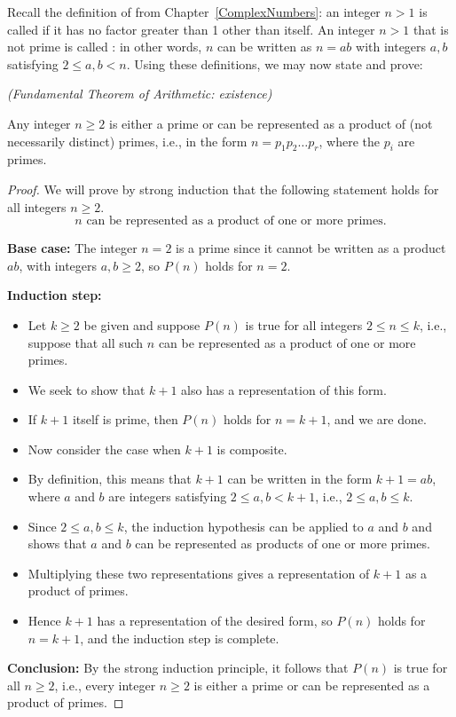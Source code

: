 Recall the definition of  from Chapter~\ref{ComplexNumbers}: an integer $n>1$ is called 
 if it has no factor greater than 1 other than itself. An integer $n>1$ that is not prime is called
: in other words, $n$ can be written as $n=ab$
with integers $a,b$ satisfying $2\le a,b<n$. Using these definitions, we may now state and prove:

\begin{prop}{}\emph{(Fundamental Theorem of Arithmetic: existence)}

Any integer $n\ge 2$
is either a prime or can be represented as a product of (not
necessarily distinct) primes, i.e., in the form $n=p_1p_2\dots p_r$,
where the $p_i$ are primes.
\end{prop}

\begin{proof}
We will prove by strong induction that the following statement  
holds for all integers $n\ge2$.
\[
\text{$n$ can be represented as a product of one or more primes.}
\tag{$P(n)$}
\]

\noindent
\textbf{Base case:} The integer $n=2$ is a prime since it cannot be
written as a product $ab$, with integers $a,b\ge 2$,  so $P(n)$ holds
for $n=2$.

\noindent
\textbf{Induction step:} 
\begin{itemize}

\item Let $k\ge2$ be given and suppose $P(n)$ is true for all 
integers $2\le n\le k$, i.e., suppose that all such $n$ can be represented 
as a product of one or more primes.
\item We seek to show that $k+1$ also has a
representation of this form.
\item
If $k+1$ itself is prime, then $P(n)$ holds for $n=k+1$, and we are done.
\item
Now consider the case when $k+1$ is composite.
\item 
By definition, this means that $k+1$
can be written in the form $k+1=ab$, where $a$ and $b$ are integers satisfying
$2\le a,b< k+1$, i.e., $2\le a,b\le k$. 
\item
Since $2\le a,b\le k$, the induction hypothesis can be applied to $a$ and $b$
and shows that $a$ and $b$ can be represented as products
of one or more primes.
\item
Multiplying these two representations gives a representation of $k+1$ as
a product of primes. 
\item
Hence $k+1$ has a representation of the desired form, so $P(n)$ holds
for $n=k+1$, and the induction step is
complete.
\end{itemize}

\noindent
\textbf{Conclusion:} By the strong induction principle, 
it follows that $P(n)$  is true for all $n\ge2$, i.e., every integer
$n\ge2$ is either a prime or can be represented as a product of primes.
\end{proof}

